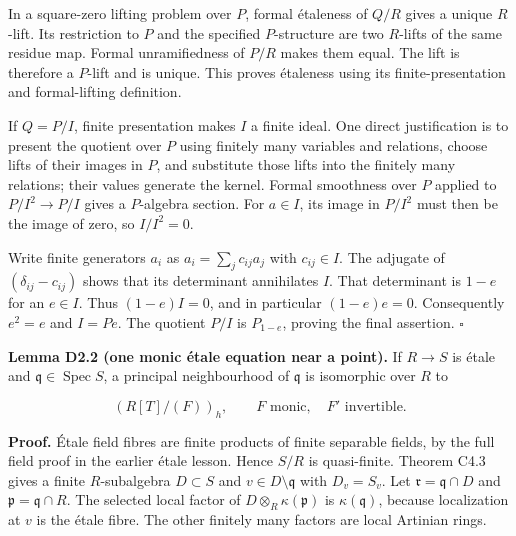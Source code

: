 \documentclass[11pt,a4paper,openany]{report}
\begin{document}
In a square-zero lifting problem over \(P\), formal étaleness of \(Q/R\) gives a unique \(R\)-lift. Its restriction to \(P\) and the specified \(P\)-structure are two \(R\)-lifts of the same residue map. Formal unramifiedness of \(P/R\) makes them equal. The lift is therefore a \(P\)-lift and is unique. This proves étaleness using its finite-presentation and formal-lifting definition.

If \(Q=P/I\), finite presentation makes \(I\) a finite ideal. One direct justification is to present the quotient over \(P\) using finitely many variables and relations, choose lifts of their images in \(P\), and substitute those lifts into the finitely many relations; their values generate the kernel. Formal smoothness over \(P\) applied to \(P/I^2\to P/I\) gives a \(P\)-algebra section. For \(a\in I\), its image in \(P/I^2\) must then be the image of zero, so \(I/I^2=0\).

Write finite generators \(a_i\) as \(a_i=\sum_jc_{ij}a_j\) with \(c_{ij}\in I\). The adjugate of \((\delta_{ij}-c_{ij})\) shows that its determinant annihilates \(I\). That determinant is \(1-e\) for an \(e\in I\). Thus \((1-e)I=0\), and in particular \((1-e)e=0\). Consequently \(e^2=e\) and \(I=Pe\). The quotient \(P/I\) is \(P_{1-e}\), proving the final assertion. \(\square\)

\textbf{Lemma D2.2 (one monic étale equation near a point).} If \(R\to S\) is étale and \(\mathfrak q\in\operatorname{Spec}S\), a principal neighbourhood of \(\mathfrak q\) is isomorphic over \(R\) to

\[
(R[T]/(F))_h,\qquad F\text{ monic},\quad F'\text{ invertible}.          \tag{2.1}
\]

\textbf{Proof.} Étale field fibres are finite products of finite separable fields, by the full field proof in the earlier étale lesson. Hence \(S/R\) is quasi-finite. Theorem C4.3 gives a finite \(R\)-subalgebra \(D\subset S\) and \(v\in D\setminus\mathfrak q\) with \(D_v=S_v\). Let \(\mathfrak r=\mathfrak q\cap D\) and \(\mathfrak p=\mathfrak q\cap R\). The selected local factor of \(D\otimes_R\kappa(\mathfrak p)\) is \(\kappa(\mathfrak q)\), because localization at \(v\) is the étale fibre. The other finitely many factors are local Artinian rings.
\end{document}
